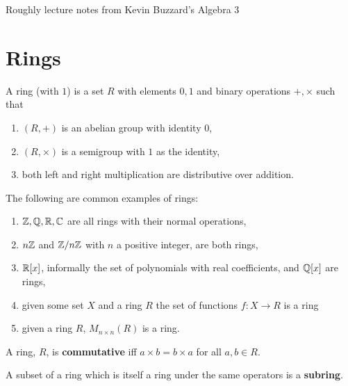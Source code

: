 \documentclass{report}
\begin{document}
\renewcommand*\thesection{\arabic{section}}

Roughly lecture notes from Kevin Buzzard's Algebra 3

\section{Rings}
\setcounter{subsection}{1}

\begin{definition}[Ring]
    A ring (with $1$) is a set $R$ with elements $0,1$ and binary operations $+,\times$ such that \begin{enumerate}
        \item $(R,+)$ is an abelian group with identity $0$,
        \item $(R,\times)$ is a semigroup with $1$ as the identity,
        \item both left and right multiplication are distributive over addition.
    \end{enumerate}
\end{definition}

\begin{examples}
    The following are common examples of rings:
    \begin{enumerate}
        \item  $\mathbb{Z},\mathbb{Q},\mathbb{R},\mathbb{C}$ are all rings with their normal operations,
        \item $n\mathbb{Z}$ and $\mathbb{Z}/n\mathbb{Z}$ with $n$ a positive integer, are both rings,
        \item $\mathbb{R}[x]$, informally the set of polynomials with real coefficients, and $\mathbb{Q}[x]$ are rings,
        \item given some set $X$ and a ring $R$ the set of functions $f:X\rightarrow R$ is a ring
        \item given a ring $R$, $M_{n\times n}(R)$ is a ring.
    \end{enumerate}
\end{examples}

\begin{definition}
    A ring, $R$, is \textbf{commutative} iff $a\times b=b\times a$ for all $a,b\in R$.
\end{definition}

\begin{definition}[Subring]
    A subset of a ring which is itself a ring under the same operators is a \textbf{subring}.
\end{definition}
\end{document}
